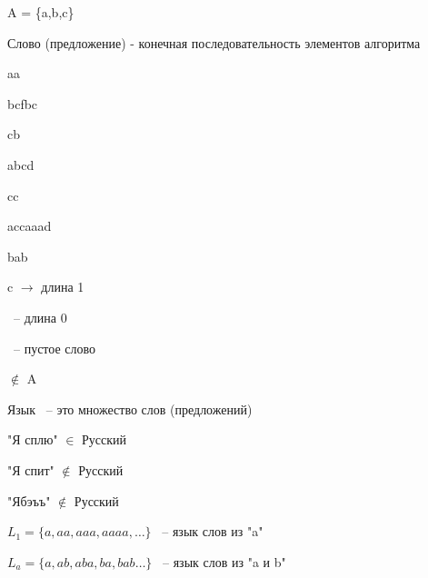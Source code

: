 \documentclass[russian]{lecture-notes}
\begin{document}
    \begin{example}

        A = \{a,b,c\}

        \end{example}

    \begin{definition}

        Слово (предложение) - конечная последовательность элементов алгоритма

        \end{definition}

    \begin{example}

        aa


        bcfbc

        cb

        abcd

        cc

        accaaad

        bab

        c $\rightarrow$ длина 1

        \Lambda ~-- длина 0 \Lambda

        \Lambda ~-- пустое слово




        \Labda $\notin$ A
        \end{example}

    \begin{definition}

        Язык ~-- это множество слов (предложений)

        \end{definition}

    "Я сплю" $\in$ Русский

    "Я спит" $\notin$ Русский

    "Ябэъъ" $\notin$ Русский

    \begin{example}

        $L_{1} = \{ a,aa,aaa,aaaa, \dots \}$ ~-- язык слов из "a"

        \end{example}

    \begin{example}

        $L_{a} = \{ a,ab,aba,ba,bab \dots \}$ ~-- язык слов из "a и b"

        \end{example}
\end{document}
